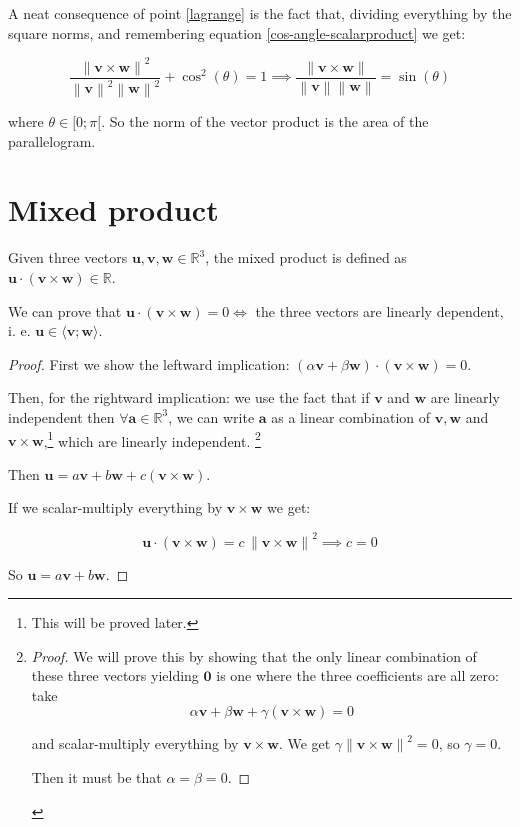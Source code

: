 \documentclass[12pt,a4paper]{report}
\newcommand{\norm}[1]{\left\lVert#1\right\rVert}
\numberwithin{equation}{section}
\theoremstyle{definition}
\theoremstyle{remark}
\begin{document}
A neat consequence of point \ref{lagrange} is the fact that, dividing everything by the square norms, and remembering equation \eqref{cos-angle-scalarproduct} we get:

\begin{equation}
\frac{\norm{\mathbf{v} \times \mathbf{w}}^2}{\norm{\mathbf{v}}^2\norm{\mathbf{w}}^2} + \cos^2 (\theta) = 1
\implies
\frac{\norm{\mathbf{v} \times \mathbf{w}}}{\norm{\mathbf{v}}\norm{\mathbf{w}}} = \sin(\theta)
\end{equation}

where $\theta \in [ 0; \pi [$. So the norm of the vector product is the area of the parallelogram.

\section{Mixed product}

Given three vectors $\mathbf{u}, \mathbf{v}, \mathbf{w} \in \mathbb{R}^3$, the mixed product is defined as $\mathbf{u} \cdot (\mathbf{v} \times \mathbf{w}) \in \mathbb{R}$.

We can prove that $\mathbf{u} \cdot (\mathbf{v} \times \mathbf{w}) = 0 \iff $ the three vectors are linearly dependent, i. e. $\mathbf{u} \in \langle\mathbf{v}; \mathbf{w}\rangle$.

\begin{proof}
First we show the leftward implication: $(\alpha \mathbf{v} + \beta \mathbf{w}) \cdot (\mathbf{v}\times \mathbf{w}) = 0$.

Then, for the rightward implication: we use the fact that if $\mathbf{v}$ and $\mathbf{w}$ are linearly independent then $\forall \mathbf{a} \in \mathbb{R}^3$, we can write $\mathbf{a}$ as a linear combination of $\mathbf{v}, \mathbf{w}$ and $\mathbf{v}\times \mathbf{w}$,\footnote{This will be proved later.} which are linearly independent.
\footnote{\begin{proof}
We will prove this by showing that the only linear combination of these three vectors yielding $\mathbf{0}$ is one where the three coefficients are all zero: take
\begin{equation}
\alpha \mathbf{v}+ \beta \mathbf{w} + \gamma (\mathbf{v} \times \mathbf{w}) = 0
\end{equation}

and scalar-multiply everything by $\mathbf{v} \times \mathbf{w}$. We get $\gamma \norm{\mathbf{v} \times \mathbf{w}}^2 = 0$, so $\gamma = 0$.

Then it must be that $\alpha = \beta = 0$.
\end{proof}}

Then $\mathbf{u} = a \mathbf{v} + b\mathbf{w} + c (\mathbf{v} \times \mathbf{w})$. 

If we scalar-multiply everything by $\mathbf{v} \times \mathbf{w}$ we get:

\begin{equation}
\mathbf{u} \cdot (\mathbf{v}\times\mathbf{w}) = c\, \norm{\mathbf{v}\times \mathbf{w}}^2 \implies c=0
\end{equation}

So $\mathbf{u} = a \mathbf{v} + b \mathbf{w}$.

\end{proof}
\end{document}
